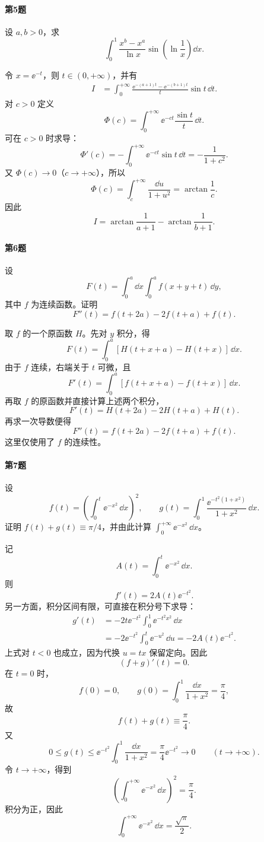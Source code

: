\paragraph{第5题}
设 $a,b>0$，求
\[
\int_0^1\frac{x^b-x^a}{\ln x}\sin\left(\ln\frac1x\right)\dd x.
\]

\begin{xsolution}
令 $x=\ee^{-t}$，则 $t\in(0,+\infty)$，并有
\[
\begin{aligned}
I
&=\int_0^{+\infty}\frac{\ee^{-(a+1)t}-\ee^{-(b+1)t}}{t}\sin t\,\dd t.
\end{aligned}
\]
对 $c>0$ 定义
\[
\Phi(c)=\int_0^{+\infty}\ee^{-ct}\frac{\sin t}{t}\,\dd t.
\]
可在 $c>0$ 时求导：
\[
\Phi'(c)=-\int_0^{+\infty}\ee^{-ct}\sin t\,\dd t=-\frac1{1+c^2}.
\]
又 $\Phi(c)\to0$（$c\to+\infty$），所以
\[
\Phi(c)=\int_c^{+\infty}\frac{\dd u}{1+u^2}=\arctan\frac1c.
\]
因此
\[
\boxed{I=\arctan\frac1{a+1}-\arctan\frac1{b+1}}.
\]
\end{xsolution}

\paragraph{第6题}
设
\[
F(t)=\int_0^a\dd x\int_0^a f(x+y+t)\,\dd y,
\]
其中 $f$ 为连续函数。证明
\[
F''(t)=f(t+2a)-2f(t+a)+f(t).
\]

\begin{xsolution}
取 $f$ 的一个原函数 $H$。先对 $y$ 积分，得
\[
F(t)=\int_0^a[H(t+x+a)-H(t+x)]\,\dd x.
\]
由于 $f$ 连续，右端关于 $t$ 可微，且
\[
F'(t)=\int_0^a[f(t+x+a)-f(t+x)]\,\dd x.
\]
再取 $f$ 的原函数并直接计算上述两个积分，
\[
F'(t)=H(t+2a)-2H(t+a)+H(t).
\]
再求一次导数便得
\[
\boxed{F''(t)=f(t+2a)-2f(t+a)+f(t)}.
\]
这里仅使用了 $f$ 的连续性。
\end{xsolution}

\paragraph{第7题}
设
\[
f(t)=\left(\int_0^t\ee^{-x^2}\,\dd x\right)^2,
\qquad
g(t)=\int_0^1\frac{\ee^{-t^2(1+x^2)}}{1+x^2}\,\dd x.
\]
证明 $f(t)+g(t)\equiv\pi/4$，并由此计算
$\int_0^{+\infty}\ee^{-x^2}\,\dd x$。

\begin{xsolution}
记
\[
A(t)=\int_0^t\ee^{-x^2}\,\dd x.
\]
则
\[
f'(t)=2A(t)\ee^{-t^2}.
\]
另一方面，积分区间有限，可直接在积分号下求导：
\[
\begin{aligned}
g'(t)
&=-2t\ee^{-t^2}\int_0^1\ee^{-t^2x^2}\,\dd x\\
&=-2\ee^{-t^2}\int_0^t\ee^{-u^2}\,\dd u
=-2A(t)\ee^{-t^2}.
\end{aligned}
\]
上式对 $t<0$ 也成立，因为代换 $u=tx$ 保留定向。因此
\[
(f+g)'(t)=0.
\]
在 $t=0$ 时，
\[
f(0)=0,
\qquad
g(0)=\int_0^1\frac{\dd x}{1+x^2}=\frac\pi4,
\]
故
\[
\boxed{f(t)+g(t)\equiv\frac\pi4}.
\]
又
\[
0\leqslant g(t)\leqslant\ee^{-t^2}\int_0^1\frac{\dd x}{1+x^2}
=\frac\pi4\ee^{-t^2}\to0
\qquad(t\to+\infty).
\]
令 $t\to+\infty$，得到
\[
\left(\int_0^{+\infty}\ee^{-x^2}\,\dd x\right)^2=\frac\pi4.
\]
积分为正，因此
\[
\boxed{\int_0^{+\infty}\ee^{-x^2}\,\dd x=\frac{\sqrt\pi}{2}}.
\]
\end{xsolution}

